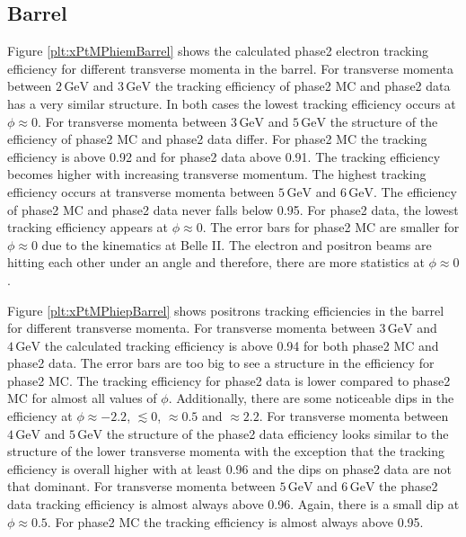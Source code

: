 \documentclass[a4paper,11pt,twosided,final,german,openbib,pdftex,listof=totoc,bibliography=totoc]{scrbook}
\begin{document}
\newpage

\subsection{Barrel}

Figure \ref{plt:xPtMPhiemBarrel} shows the calculated phase2 electron tracking efficiency for different transverse momenta in the barrel. For transverse momenta between $2\,\textrm{GeV}$ and $3\,\textrm{GeV}$ the tracking efficiency of phase2 MC and phase2 data has a very similar structure. In both cases the lowest tracking efficiency occurs at $\phi \approx 0$. 
For transverse momenta between $3\,\textrm{GeV}$ and $5\,\textrm{GeV}$ the structure of the efficiency of phase2 MC and phase2 data differ. For phase2 MC the tracking efficiency is above 0.92 and for phase2 data above 0.91. The tracking efficiency becomes higher with increasing transverse momentum. The highest tracking efficiency occurs at transverse momenta between $5\,\textrm{GeV}$ and $6\,\textrm{GeV}$. The efficiency of phase2 MC and phase2 data never falls below 0.95. 
For phase2 data, the lowest tracking efficiency appears at $\phi \approx 0$. The error bars for phase2 MC are smaller for $\phi \approx 0$ due to the kinematics at Belle II. The electron and positron beams are hitting each other under an angle and therefore, there are more statistics at $\phi \approx 0$.


Figure \ref{plt:xPtMPhiepBarrel} shows positrons tracking efficiencies in the barrel for different transverse momenta. 
For transverse momenta between $3\,\textrm{GeV}$ and $4\,\textrm{GeV}$ the calculated tracking efficiency is above 0.94 for both phase2 MC and phase2 data. The error bars are too big to see a structure in the efficiency for phase2 MC. The tracking efficiency for phase2 data is lower compared to phase2 MC for almost all values of $\phi$. Additionally, there are some noticeable dips in the efficiency at $\phi \approx -2.2$, $ \lesssim 0$, $ \approx 0.5$ and $ \approx 2.2$. 
For transverse momenta between $4\,\textrm{GeV}$ and $5\,\textrm{GeV}$ the structure of the phase2 data efficiency looks similar to the structure of the lower transverse momenta with the exception that the tracking efficiency is overall higher with at least 0.96 and the dips on phase2 data are not that dominant. 
For transverse momenta between $5\,\textrm{GeV}$ and $6\,\textrm{GeV}$ the phase2 data tracking efficiency is almost always above 0.96. Again, there is a small dip at $\phi \approx 0.5$. For phase2 MC the tracking efficiency is almost always above 0.95. 
\end{document}

